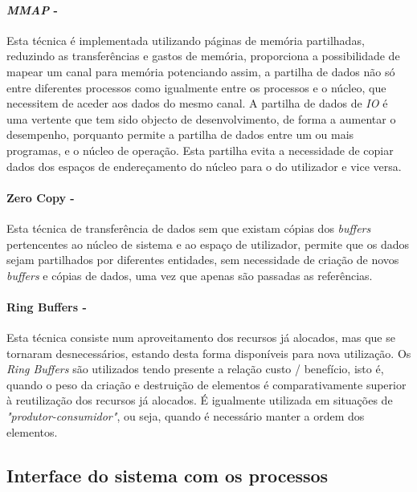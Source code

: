 \paragraph*{\textit{MMAP} - }

Esta técnica é implementada utilizando páginas de memória partilhadas, reduzindo as transferências e gastos de memória, proporciona a possibilidade de mapear um canal para memória potenciando assim, a partilha de dados não só entre diferentes processos como igualmente entre os processos e o núcleo, que necessitem de aceder aos dados do mesmo canal.
A partilha de dados de \textit{IO} é uma vertente que tem sido objecto de desenvolvimento, de forma a aumentar o desempenho, porquanto permite a partilha de dados entre um ou mais programas, e o núcleo de operação.
Esta partilha evita a necessidade de copiar dados dos espaços de endereçamento do núcleo para o do utilizador e vice versa.

\paragraph*{Zero Copy - }

Esta técnica de transferência de dados sem que existam cópias dos \textit{buffers} pertencentes ao núcleo de sistema e ao espaço de utilizador, permite que os dados sejam partilhados por diferentes entidades, sem necessidade de criação de novos \textit{buffers} e cópias de dados, uma vez que apenas são passadas as referências.

\paragraph*{Ring Buffers - }

Esta técnica consiste num aproveitamento dos recursos já alocados, mas que se tornaram desnecessários, estando desta forma disponíveis para nova utilização.
Os \textit{Ring Buffers} são utilizados tendo presente a relação custo / benefício, isto é, quando o peso da criação e destruição de elementos é comparativamente superior à reutilização dos recursos já alocados.
É igualmente utilizada em situações de \textit{"produtor-consumidor"}, ou seja, quando é necessário manter a ordem dos elementos.


\subsection{Interface do sistema com os processos}
% 

